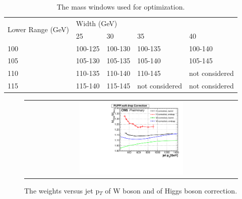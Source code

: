\begin{table}[h!]
  \begin{center}
   \begin{tabular}{|l|l|l|l|l|}
\hline
\multirow{2}{*}{Lower Range (GeV)} & \multicolumn{4}{l|}{Width (GeV)} \\ \cline{2-5} 
                                   & 25     & 30     & 35     & 40    \\ \hline
100                                & 100-125 & 100-130  &  100-135  &  100-140     \\ \hline
105      &  105-130      &   105-135     &  105-140      &    105-145   \\ \hline
110      &  110-135      &   110-140     &  110-145      &    not considered   \\ \hline
115      &  115-140      &   115-145     &  not considered      &    not considered   \\ \hline
\end{tabular}
\caption{The mass windows used for optimization.}
  \end{center}
  \end{table}


\begin{figure}[t]
  \centering
  \begin{tabular}{c}
    \includegraphics[width=0.5\textwidth]{Figures/ap1/recoOne.pdf} 
  \end{tabular}
  \caption{The weights versus jet p$_{T}$ of W boson and of Higgs boson correction.}
  \label{fig:hvt_brs}
\end{figure}


